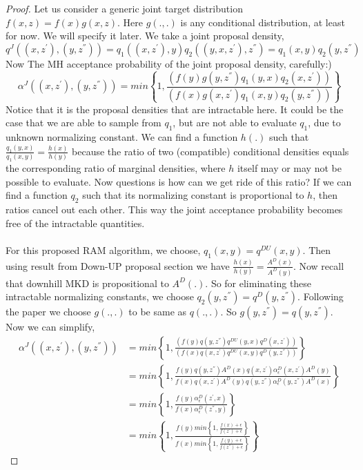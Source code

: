 \documentclass{article}
\begin{document}
\begin{proof}
Let us consider a generic joint target distribution $f(x,z)=f(x)g(x,z)$. Here $g(.,.)$ is any conditional distribution, at least for now. We will specify it later. We take a joint proposal density,
\begin{equation*}
    q^{J}((x,z^{'}),(y,z^{''})) = q_1((x,z^{'}),y)q_2((y,x,z^{'}),z^{''}) = q_1(x,y)q_2(y,z^{''})
\end{equation*}
Now The MH acceptance probability of the joint proposal density, carefully:)
\begin{equation*}
    \alpha^{J}((x,z^{'}),(y,z^{''}))=min\left\{1,\frac{(f(y)g(y,z^{''})q_1(y,x)q_2(x,z^{'}))}{(f(x)g(x,z^{'})q_1(x,y)q_2(y,z^{''}))}\right\}
\end{equation*}
Notice that it is the proposal densities that are intractable here. It could be the case that we are able to sample from $q_1$, but are not able to evaluate $q_1$, due to unknown normalizing constant. We can find a function $h(.)$ such that $\frac{q_1(y,x)}{q_1(x,y)}=\frac{h(x)}{h(y)}$ because  the ratio of two (compatible) conditional densities equals the corresponding ratio of marginal densities, where $h$ itself may or may not be possible to evaluate. Now questions is how can we get ride of this ratio? If we can find a function $q_2$ such that its normalizing constant is proportional to $h$, then ratios cancel out each other. This way the joint acceptance probability becomes free of the intractable quantities.
\paragraph{}For this proposed RAM algorithm, we choose, $q_1(x,y)=q^{DU}(x,y)$. Then using result from Down-UP proposal section we have $\frac{h(x)}{h(y)}=\frac{A^D(x)}{A^D(y)}$. Now recall that downhill MKD is propositional to $A^D(.)$. So for eliminating these intractable normalizing constants, we choose $q_2(y,z^{''})=q^{D}(y,z^{''})$. Following the paper we choose $g(.,.)$ to be same as $q(.,.)$. So $g(y,z^{''})=q(y,z^{''})$. Now we can simplify,
\begin{align*}
    \alpha^{J}((x,z^{'}),(y,z^{''}))&=min\left\{1,\frac{(f(y)q(y,z^{''})q^{DU}(y,x)q^D(x,z^{'}))}{(f(x)q(x,z^{'})q^{DU}(x,y)q^D(y,z^{''}))}\right\}\\
    &=min\left\{1,\frac{f(y)q(y,z^{''})A^D(x)q(x,z^{'})\alpha_{\epsilon}^D(x,z^{'})A^D(y)}{f(x)q(x,z^{'})A^D(y)q(y,z^{''})\alpha_{\epsilon}^D(y,z^{''})A^D(x)}\right\}\\
    &=min\left\{1,\frac{f(y)\alpha_\epsilon^{D}(z^{'},x)}{f(x)\alpha_\epsilon^{D}(z^{''},y)}\right\}\\
    &= min\left\{1,\frac{f(y)min\left\{1,\frac{f(x)+\epsilon}{f(z^{'})+\epsilon}\right\}}{f(x)min\left\{1,\frac{f(y)+\epsilon}{f(z^{''})+\epsilon}\right\}}\right\}
\end{align*}
\end{proof}
\end{document}
